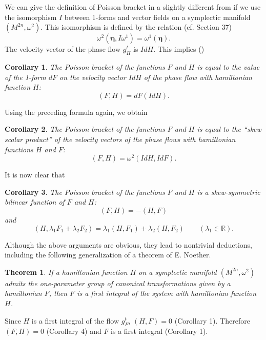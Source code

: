 \documentclass{book}
\numberwithin{equation}{section}
\theoremstyle{plain}
\newtheorem{cor}{Corollary}
\newtheorem*{thm*}{Theorem}
\let\oldendproof\endproof
\renewenvironment{proof}[1][\proofname]{%
  \oldproof[\textsc{#1}]%
}{\oldendproof}
\theoremstyle{definition}
\theoremstyle{remark}
\theoremstyle{smallcap}
\numberwithin{prob}{section}
\begin{document}
We can give the definition of Poisson bracket in a slightly
different from if we use the isomorphism $I$ between 1-forms
and vector fields on a symplectic manifold $(M^{2n}, \omega^2)$.
%
%
This isomorphism is defined by the relation (cf. Section 37)
$$
\omega^2(\pmb\eta, I\omega^1)
=
\omega^1(\pmb\eta).
$$
The velocity vector of the phase flow $g_H^t$ is $IdH$.
This implies
()

\begin{cor}
  The Poisson bracket of the functions $F$ and $H$
  is equal to the value of the 1-form $dF$
  on the velocity vector $IdH$ of the phase flow with
  hamiltonian function $H$:
  $$
  (F, H) = dF(IdH).
  $$
\end{cor}

Using the preceding formula again, we obtain

\begin{cor}
  The Poisson bracket of the functions $F$ and $H$ is equal to the
  ``skew scalar product'' of the velocity vectors of the phase flows
  with hamiltonian functions $H$ and $F$:
  $$
  (F, H) = \omega^2(IdH, IdF).
  $$
\end{cor}

It is now clear that

\begin{cor}
  The Poisson bracket of the functions $F$ and $H$
  is a skew-symmetric bilinear function of $F$ and $H$:
  $$
  (F, H) = -(H, F)
  $$
  and
  $$
  (H, \lambda_1 F_1 + \lambda_2 F_2)
  =
  \lambda_1 (H, F_1)
  +
  \lambda_2 (H, F_2)
  \qquad
  (\lambda_1 \in \mathbb R).
  $$
\end{cor}

Although the above arguments are obvious,
they lead to nontrivial deductions,
including the following generalization
of a theorem of E. Noether.

\begin{thm*}
  If a hamiltonian function $H$ on a symplectic manifold $(M^{2n}, \omega^2)$
  admits the one-parameter group of canonical transformations
  given by a hamiltonian $F$,
  then $F$ is a first integral of the system with hamiltonian function $H$.
\end{thm*}

\begin{proof}
  Since $H$ is a first integral of the flow $g_F^t$,
  $(H, F) = 0$ (Corollary 1).
  Therefore $(F, H) = 0$ (Corollary 4)
  and $F$ is a first integral (Corollary 1).

\end{proof}
\end{document}
